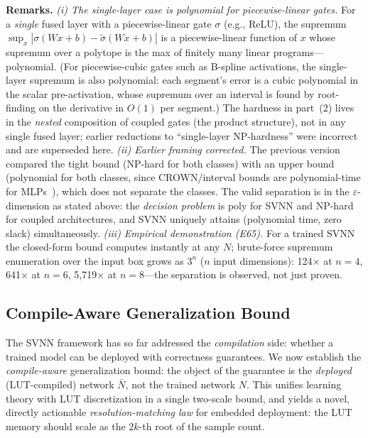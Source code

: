 \vspace{2pt}
\noindent\textbf{Remarks.}
\textit{(i) The single-layer case is polynomial for piecewise-linear
gates.} For a \emph{single} fused layer with a piecewise-linear gate
$\sigma$ (e.g., ReLU), the supremum
$\sup_x |\sigma(Wx+b) - \tilde{\sigma}(Wx+b)|$ is a piecewise-linear
function of $x$ whose supremum over a polytope is the max of finitely
many linear programs---polynomial. (For piecewise-cubic gates such as
B-spline activations, the single-layer supremum is also polynomial:
each segment's error is a cubic polynomial in the scalar pre-activation,
whose supremum over an interval is found by root-finding on the
derivative in $O(1)$ per segment.) The hardness in part~(2) lives in the
\emph{nested} composition of coupled gates (the product structure),
not in any single fused layer; earlier reductions to ``single-layer
NP-hardness'' were incorrect and are superseded here.
\textit{(ii) Earlier framing corrected.} The previous version compared the
tight bound (NP-hard for both classes) with an upper bound (polynomial
for both classes, since CROWN/interval bounds are polynomial-time for
MLPs~\cite{alphabetacrown2021,katz2019marabou}), which does not separate
the classes. The valid separation is in the $\varepsilon$-dimension as
stated above: the \emph{decision problem} is poly for SVNN and NP-hard
for coupled architectures, and SVNN uniquely attains
(polynomial time, zero slack) simultaneously.
\textit{(iii) Empirical demonstration (E65).} For a trained SVNN the
closed-form bound computes instantly at any $N$; brute-force supremum
enumeration over the input box grows as $3^n$ ($n$ input dimensions):
124$\times$ at $n=4$, 641$\times$ at $n=6$, 5{,}719$\times$ at $n=8$---the
separation is observed, not just proven.


\subsection{Compile-Aware Generalization Bound}
\label{sec:svnn-generalization}

The SVNN framework has so far addressed the \textit{compilation} side:
whether a trained model can be deployed with correctness guarantees. We now
establish the \emph{compile-aware} generalization bound: the object of the
guarantee is the \emph{deployed} (LUT-compiled) network $\bar{N}$, not the
trained network $N$. This unifies learning theory with LUT discretization
in a single two-scale bound, and yields a novel, directly actionable
\emph{resolution-matching law} for embedded deployment: the LUT memory
should scale as the $2k$-th root of the sample count.

